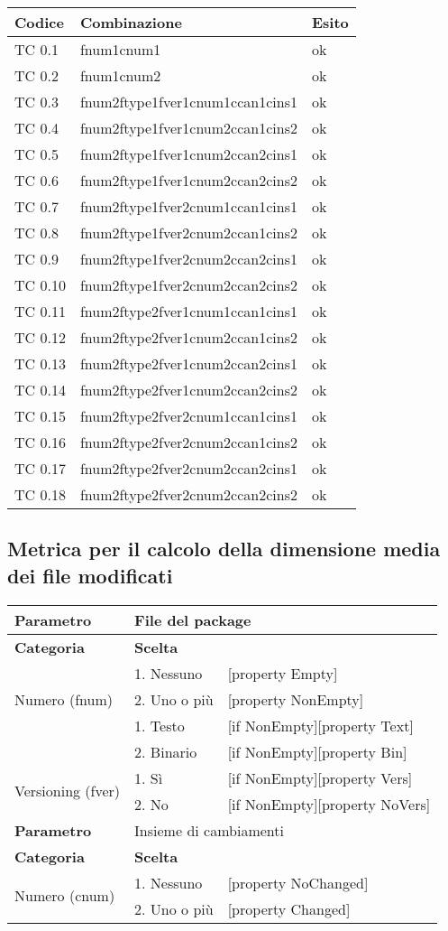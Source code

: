 \begin{tabular}{|p{3cm}|p{7cm}|p{3cm}|}
	\hline
	\rowcolor{Gray}
	\textbf{Codice} & \textbf{Combinazione} & \textbf{Esito}\tabularnewline
	\hline
	TC 0.1			& fnum1cnum1					& ok \tabularnewline
	\hline
	TC 0.2			& fnum1cnum2					& ok \tabularnewline
	\hline
	TC 0.3			& fnum2ftype1fver1cnum1ccan1cins1		& ok \tabularnewline
	\hline
	TC 0.4			& fnum2ftype1fver1cnum2ccan1cins2		& ok \tabularnewline
	\hline
	TC 0.5			& fnum2ftype1fver1cnum2ccan2cins1		& ok \tabularnewline
	\hline
	TC 0.6			& fnum2ftype1fver1cnum2ccan2cins2		& ok \tabularnewline
	\hline
	TC 0.7			& fnum2ftype1fver2cnum1ccan1cins1		& ok \tabularnewline
	\hline
	TC 0.8			& fnum2ftype1fver2cnum2ccan1cins2		& ok \tabularnewline
	\hline
	TC 0.9			& fnum2ftype1fver2cnum2ccan2cins1		& ok \tabularnewline
	\hline
	TC 0.10			& fnum2ftype1fver2cnum2ccan2cins2		& ok \tabularnewline
	\hline
	TC 0.11			& fnum2ftype2fver1cnum1ccan1cins1		& ok \tabularnewline
	\hline
	TC 0.12			& fnum2ftype2fver1cnum2ccan1cins2		& ok \tabularnewline
	\hline
	TC 0.13			& fnum2ftype2fver1cnum2ccan2cins1		& ok \tabularnewline
	\hline
	TC 0.14			& fnum2ftype2fver1cnum2ccan2cins2		& ok \tabularnewline
	\hline
	TC 0.15			& fnum2ftype2fver2cnum1ccan1cins1		& ok \tabularnewline
	\hline
	TC 0.16			& fnum2ftype2fver2cnum2ccan1cins2		& ok \tabularnewline
	\hline
	TC 0.17			& fnum2ftype2fver2cnum2ccan2cins1		& ok \tabularnewline
	\hline
	TC 0.18			& fnum2ftype2fver2cnum2ccan2cins2		& ok \tabularnewline
	\hline
\end{tabular}
\clearpage




\subsection{Metrica per il calcolo della dimensione media dei file modificati}

\begin{tabular}{|p{4cm}|p{4cm}p{5cm}|}
	\hline
	\cellcolor{Gray} \textbf{Parametro}				& \multicolumn{2}{l|}{File del package}							\tabularnewline
	\hline
	\rowcolor{Gray}
	\textbf{Categoria}						& \textbf{Scelta}			&						\tabularnewline
	\hline
	\multirow{3}{*}{Numero (fnum)}					& 1. Nessuno				&	[property Empty] 			\tabularnewline
									\cline{2-3}
									& 2. Uno o più				&	[property NonEmpty]			\tabularnewline
	\hline
	\multirow{2}{*}{Tipo (ftype)}					& 1. Testo				&	[if NonEmpty][property Text] 		\tabularnewline
									\cline{2-3}
									& 2. Binario				&	[if NonEmpty][property Bin]		\tabularnewline
	\hline
	\multirow{2}{*}{Versioning (fver)}				& 1. Sì					&	[if NonEmpty][property Vers] 		\tabularnewline
									\cline{2-3}
									& 2. No					&	[if NonEmpty][property NoVers]		\tabularnewline
	\hline
	
	\cellcolor{Gray} \textbf{Parametro}				& \multicolumn{2}{l|}{Insieme di cambiamenti}						\tabularnewline
	\hline
	\rowcolor{Gray}
	\textbf{Categoria}						& \textbf{Scelta}			&						\tabularnewline
	\hline
	\multirow{3}{*}{Numero (cnum)}					& 1. Nessuno				&	[property NoChanged] 			\tabularnewline
									\cline{2-3}
									& 2. Uno o più				&	[property Changed]			\tabularnewline
	\hline
\end{tabular}

